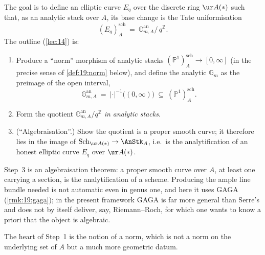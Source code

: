 \begin{remark}
\label{rmk:19:tate-goal}
The goal is to define an elliptic curve $E_q$ over the discrete ring $\ur A(\ast)$
such that, as an analytic stack over $A$, its base change is the Tate uniformisation
\begin{equation*}
(E_q)^{\mathrm{sch}}_A\ =\ \mathbb{G}_{m,A}^{\mathrm{an}}\big/\,q^{\mathbb Z}.
\end{equation*}
The outline (\cref{lec:14}) is:
\begin{enumerate}
\item Produce a ``norm'' morphism of analytic stacks
$(\mathbb P^1)^{\mathrm{sch}}_A\to[0,\infty]$ (in the precise sense of
\cref{def:19:norm} below), and define the analytic $\mathbb G_m$ as the preimage
of the open interval,
\begin{equation*}
\mathbb{G}_{m,A}^{\mathrm{an}}\ =\ |\cdot|^{-1}\bigl((0,\infty)\bigr)\ \subseteq\ (\mathbb P^1)^{\mathrm{sch}}_A .
\end{equation*}
\item Form the quotient
$\mathbb{G}_{m,A}^{\mathrm{an}}/q^{\mathbb Z}$ \emph{in analytic stacks}.
\item (``Algebraisation''.) Show the quotient is a proper
smooth curve; it therefore lies in the image of
$\operatorname{Sch}_{\ur A(\ast)}\to\AnStk_A$, i.e.\ is the analytification of an
honest elliptic curve $E_q$ over $\ur A(\ast)$.
\end{enumerate}
\end{remark}

\begin{remark}
\label{rmk:19:algebraization}
Step~3 is an algebraisation theorem: a proper smooth curve over $A$, at least one
carrying a section, is the analytification of a scheme. Producing the ample line
bundle needed is not automatic even in genus one, and here it uses GAGA
(\cref{rmk:19:gaga}); in the present framework GAGA is far more general than
Serre's and does not by itself deliver, say, Riemann--Roch, for which one wants to
know a priori that the object is algebraic.
\end{remark}

The heart of Step~1 is the notion of a norm, which is not a norm on the
underlying set of $A$ but a much more geometric datum.

